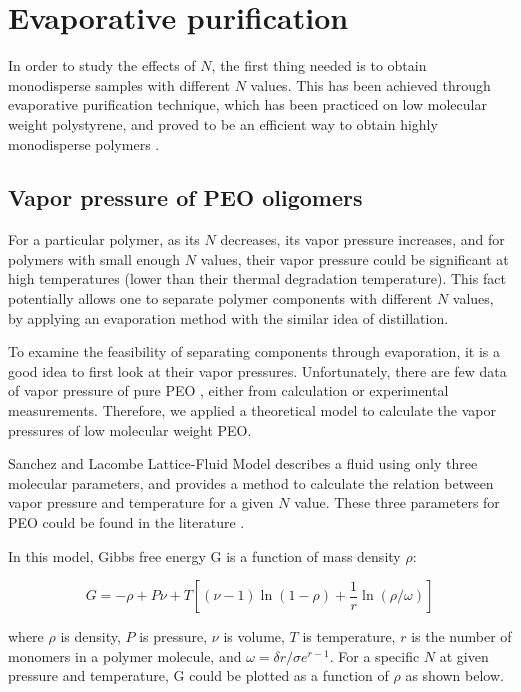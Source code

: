 \chapter{Evaporative purification}
\graphicspath{{./evaporation/graphs/}}

In order to study the effects of $N$, the first thing needed is to obtain monodisperse samples with different $N$ values. This has been achieved through evaporative purification technique, which has been practiced on low molecular weight polystyrene, and proved to be an efficient way to obtain highly monodisperse polymers \cite{Zhu2017a}.

\section{Vapor pressure of PEO oligomers}

For a particular polymer, as its $N$ decreases, its vapor pressure increases, and for polymers with small enough $N$ values, their vapor pressure could be significant at high temperatures (lower than their thermal degradation temperature). This fact potentially allows one to separate polymer components with different $N$ values, by applying an evaporation method with the similar idea of distillation.

To examine the feasibility of separating components through evaporation, it is a good idea to first look at their vapor pressures. Unfortunately, there are few data of vapor pressure of pure PEO \cite{Krieger2018}, either from calculation or experimental measurements. Therefore, we applied a theoretical model to calculate the vapor pressures of low molecular weight PEO.

Sanchez and Lacombe Lattice-Fluid Model \cite{Sanchez1976} describes a fluid using only three molecular parameters, and provides a method to calculate the relation between vapor pressure and temperature for a given $N$ value. These three parameters for PEO could be found in the literature \cite{Rodgers1993}.

In this model, Gibbs free energy G is a function of mass density $\rho$:

\begin{equation}
G = - \rho + P\nu + T[(\nu - 1)\ln(1 - \rho) + \dfrac{1}{r}\ln(\rho/\omega)]  \label{eqn_Gvsrho}
\end{equation}

\noindent
where $\rho$ is density, $P$ is pressure, $\nu$ is volume, $T$ is temperature, $r$ is the number of monomers in a polymer molecule, and $\omega = \delta r/\sigma e^{r-1}$. For a specific $N$ at given pressure and temperature, G could be plotted as a function of $\rho$ as shown below.

